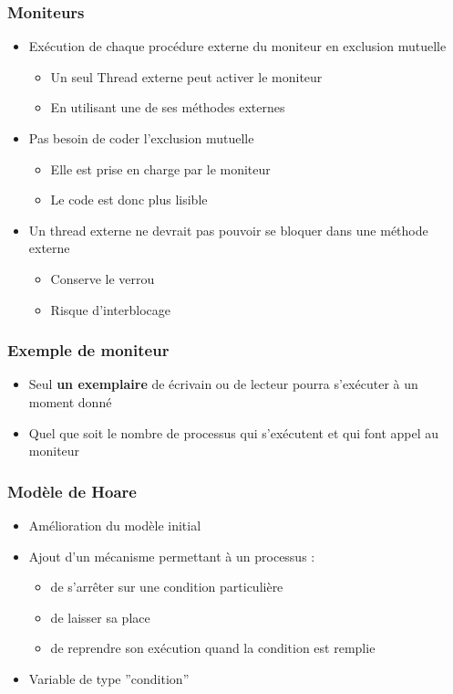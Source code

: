 \begin{frame}
\frametitle{Moniteurs}
\begin{itemize}
\item <1-> Exécution de chaque procédure externe du moniteur en exclusion mutuelle
\begin{itemize}
\item Un seul Thread externe peut activer le moniteur
\item En utilisant une de ses méthodes externes
\end{itemize}
\item <2-> Pas besoin de coder l’exclusion mutuelle
\begin{itemize}
\item Elle est prise en charge par le moniteur
\item Le code est donc plus lisible
\end{itemize}
\item <3-> Un thread externe ne devrait pas pouvoir se bloquer dans une méthode externe
\begin{itemize}
\item Conserve le verrou
\item Risque d'interblocage
\end{itemize}
\end{itemize}
\end{frame}

\begin{frame}
\frametitle{Exemple de moniteur}

\begin{itemize}
\item Seul \textbf{un exemplaire} de écrivain ou de lecteur pourra s'exécuter à un moment donné
\item Quel que soit le nombre de processus qui s'exécutent et qui font appel au moniteur
\end{itemize}
\end{frame}

\begin{frame}
\frametitle{Modèle de Hoare}
\begin{itemize}
\item <1-> Amélioration du modèle initial
\item <2-> Ajout d'un mécanisme permettant à un processus :
\begin{itemize}
\item de s'arrêter sur une condition particulière
\item de laisser sa place
\item de reprendre son exécution quand la condition est remplie
\end{itemize}
\item <3-> Variable de type ''condition''
\end{itemize}
\end{frame}


